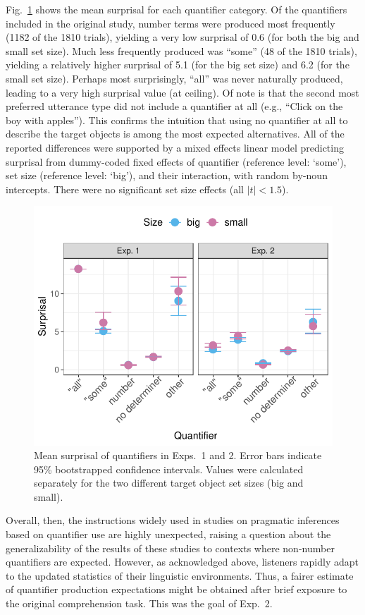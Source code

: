 \documentclass[10pt,letterpaper]{article}
\newcommand{\figref}[1]{Fig.~\ref{#1}}
\begin{document}
\figref{fig:surprisalResults} shows the mean surprisal for each quantifier category. Of the quantifiers included in the original study, number terms were produced most frequently (1182 of the 1810 trials), yielding a very low surprisal of 0.6 (for both the big and small set size). Much less frequently produced was ``some'' (48 of the 1810 trials), yielding a relatively higher surprisal of 5.1 (for the big set size) and 6.2 (for the small set size). Perhaps most surprisingly, ``all'' was never naturally produced, leading to a very high surprisal value (at ceiling). Of note is that the second most preferred utterance type did not include a quantifier at all (e.g., ``Click on the boy with apples''). This confirms the intuition that using no quantifier at all to describe the target objects is among the most expected alternatives. All of the reported differences were supported by a mixed effects linear model predicting surprisal from dummy-coded fixed effects of quantifier (reference level: `some'), set size (reference level: `big'), and their interaction, with random by-noun intercepts. There were no significant set size effects (all $|t| < 1.5$).


\begin{figure}[h]
\centering
\includegraphics[width = 0.475 \textwidth]{images/det_surprisal_faceted}
\caption{Mean surprisal of quantifiers in Exps.~1 and 2. Error bars indicate 95\% bootstrapped confidence intervals. Values were calculated separately for the two different target object set sizes (big and small).}
\label{fig:surprisalResults}
\end{figure}

Overall, then, the instructions widely used in studies on pragmatic inferences based on quantifier use \cite{huang2009,grodner2010,DegenT2016,sun2020} are highly unexpected, raising a question about the generalizability of the results of these studies to contexts where non-number quantifiers are expected. However, as acknowledged above, listeners rapidly adapt to the updated statistics of their linguistic environments. Thus, a fairer estimate of quantifier production expectations might be obtained after brief exposure to the original comprehension task. This was the goal of Exp.~2.
\end{document}
